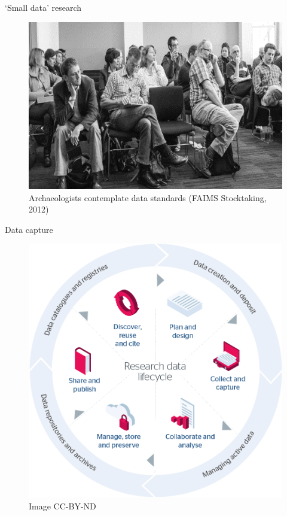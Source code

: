\documentclass[
	aspectratio=169, %
	12pt, %
	t, %
]{beamer}
\begin{document}
\begin{refsegment}
\begin{frame}{`Small data' research}
 \begin{figure}[H]
    \centering
        \vspace{-0.5cm}
        \includegraphics[height=.725\textheight]{figures/Archaeologists-standards.png}
        \caption{Archaeologists contemplate data standards (FAIMS Stocktaking, 2012)}
        \label{fig:figure7}
 \end{figure}
\end{frame}





\begin{frame}{Data capture}
 \begin{figure}[H]
    \centering
    \vspace{-0.5cm}
        \includegraphics[height=.75\textheight]{figures/research-data-life-diagram.png}
        \caption{\cite{Jisc2018-gx} Image CC-BY-ND}
        \label{fig:figure9}
 \end{figure}
\end{frame}




\end{refsegment}
\end{document}
